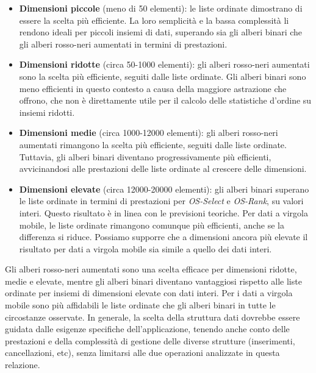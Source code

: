 \documentclass[onecolumn]{article}
\begin{document}
\begin{itemize}
\item \textbf{Dimensioni piccole} (meno di 50 elementi): le liste ordinate dimostrano di essere la scelta più efficiente. La loro semplicità e la bassa complessità li rendono ideali per piccoli insiemi di dati, superando sia gli alberi binari che gli alberi rosso-neri aumentati in termini di prestazioni.

\item \textbf{Dimensioni ridotte} (circa 50-1000 elementi): gli alberi rosso-neri aumentati sono la scelta più efficiente, seguiti dalle liste ordinate. Gli alberi binari sono meno efficienti in questo contesto a causa della maggiore astrazione che offrono, che non è direttamente utile per il calcolo delle statistiche d'ordine su insiemi ridotti.

\item \textbf{Dimensioni medie} (circa 1000-12000 elementi): gli alberi rosso-neri aumentati rimangono la scelta più efficiente, seguiti dalle liste ordinate. Tuttavia, gli alberi binari diventano progressivamente più efficienti, avvicinandosi alle prestazioni delle liste ordinate al crescere delle dimensioni.

\item \textbf{Dimensioni elevate} (circa 12000-20000 elementi): gli alberi binari superano le liste ordinate in termini di prestazioni per \textit{OS-Select} e \textit{OS-Rank}, su valori interi. Questo risultato è in linea con le previsioni teoriche. Per dati a virgola mobile, le liste ordinate rimangono comunque più efficienti, anche se la differenza si riduce. Possiamo supporre che a dimensioni ancora più elevate il risultato per dati a virgola mobile sia simile a quello dei dati interi. 
\end{itemize}

Gli alberi rosso-neri aumentati sono una scelta efficace per dimensioni ridotte, medie e elevate, mentre gli alberi binari diventano vantaggiosi rispetto alle liste ordinate per insiemi di dimensioni elevate con dati interi. Per i dati a virgola mobile sono più affidabili le liste ordinate che gli alberi binari in tutte le circostanze osservate.
In generale, la scelta della struttura dati dovrebbe essere guidata dalle esigenze specifiche dell'applicazione, tenendo anche conto delle prestazioni e della complessità di gestione delle diverse strutture (inserimenti, cancellazioni, etc), senza limitarsi alle due operazioni analizzate in questa relazione.

\newpage
\end{document}
